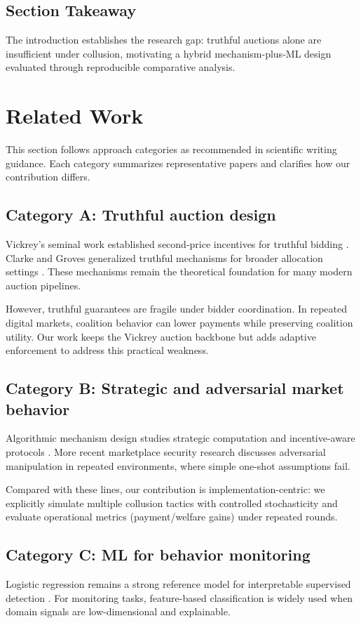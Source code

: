 \documentclass[journal]{IEEEtran}
\begin{document}
\subsection{Section Takeaway}
The introduction establishes the research gap: truthful auctions alone are insufficient under collusion, motivating a hybrid mechanism-plus-ML design evaluated through reproducible comparative analysis.

\section{Related Work}
This section follows approach categories as recommended in scientific writing guidance. Each category summarizes representative papers and clarifies how our contribution differs.

\subsection{Category A: Truthful auction design}
Vickrey's seminal work established second-price incentives for truthful bidding \cite{vickrey}. Clarke and Groves generalized truthful mechanisms for broader allocation settings \cite{clarke,groves}. These mechanisms remain the theoretical foundation for many modern auction pipelines.

However, truthful guarantees are fragile under bidder coordination. In repeated digital markets, coalition behavior can lower payments while preserving coalition utility. Our work keeps the Vickrey auction backbone but adds adaptive enforcement to address this practical weakness.

\subsection{Category B: Strategic and adversarial market behavior}
Algorithmic mechanism design studies strategic computation and incentive-aware protocols \cite{nisan}. More recent marketplace security research discusses adversarial manipulation in repeated environments, where simple one-shot assumptions fail.

Compared with these lines, our contribution is implementation-centric: we explicitly simulate multiple collusion tactics with controlled stochasticity and evaluate operational metrics (payment/welfare gains) under repeated rounds.

\subsection{Category C: ML for behavior monitoring}
Logistic regression remains a strong reference model for interpretable supervised detection \cite{hosmer,sklearn}. For monitoring tasks, feature-based classification is widely used when domain signals are low-dimensional and explainable.
\end{document}
